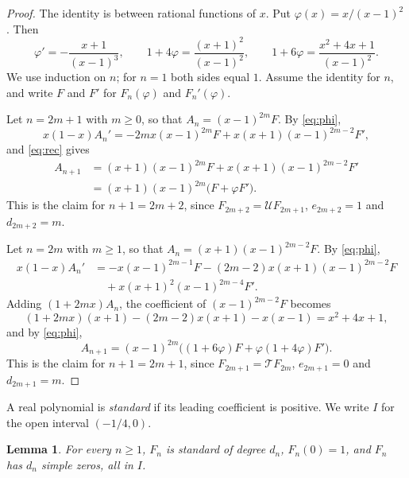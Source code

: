 \documentclass{amsart}
\newtheorem{lemma}[theorem]{Lemma}
\theoremstyle{remark}
\numberwithin{equation}{section}
\newcommand{\cU}{\mathcal{U}}
\newcommand{\cT}{\mathcal{T}}
\begin{document}
\begin{proof}
The identity is between rational functions of $x$. Put
$\varphi(x)=x/(x-1)^2$. Then
\begin{equation}\label{eq:phi}
\varphi'=-\frac{x+1}{(x-1)^3},\qquad
1+4\varphi=\frac{(x+1)^2}{(x-1)^2},\qquad
1+6\varphi=\frac{x^2+4x+1}{(x-1)^2}.
\end{equation}
We use induction on $n$; for $n=1$ both sides equal $1$. Assume the identity
for $n$, and write $F$ and $F'$ for $F_n(\varphi)$ and $F_n'(\varphi)$.

Let $n=2m+1$ with $m\ge 0$, so that $A_n=(x-1)^{2m}F$. By \eqref{eq:phi},
\[
x(1-x)A_n'=-2mx(x-1)^{2m}F+x(x+1)(x-1)^{2m-2}F',
\]
and \eqref{eq:rec} gives
\begin{align*}
A_{n+1}&=(x+1)(x-1)^{2m}F+x(x+1)(x-1)^{2m-2}F'\\
&=(x+1)(x-1)^{2m}\bigl(F+\varphi F'\bigr).
\end{align*}
This is the claim for $n+1=2m+2$, since $F_{2m+2}=\cU F_{2m+1}$,
$e_{2m+2}=1$ and $d_{2m+2}=m$.

Let $n=2m$ with $m\ge 1$, so that $A_n=(x+1)(x-1)^{2m-2}F$. By
\eqref{eq:phi},
\begin{align*}
x(1-x)A_n'&=-x(x-1)^{2m-1}F-(2m-2)x(x+1)(x-1)^{2m-2}F\\
&\quad+x(x+1)^2(x-1)^{2m-4}F'.
\end{align*}
Adding $(1+2mx)A_n$, the coefficient of $(x-1)^{2m-2}F$ becomes
\[
(1+2mx)(x+1)-(2m-2)x(x+1)-x(x-1)=x^2+4x+1,
\]
and by \eqref{eq:phi},
\[
A_{n+1}=(x-1)^{2m}\bigl((1+6\varphi)F+\varphi(1+4\varphi)F'\bigr).
\]
This is the claim for $n+1=2m+1$, since $F_{2m+1}=\cT F_{2m}$,
$e_{2m+1}=0$ and $d_{2m+1}=m$.
\end{proof}

A real polynomial is \emph{standard} if its leading coefficient is positive.
We write $I$ for the open interval $(-1/4,0)$.

\begin{lemma}\label{lem:roots}
For every $n\ge 1$, $F_n$ is standard of degree $d_n$, $F_n(0)=1$, and $F_n$
has $d_n$ simple zeros, all in $I$.
\end{lemma}
\end{document}
